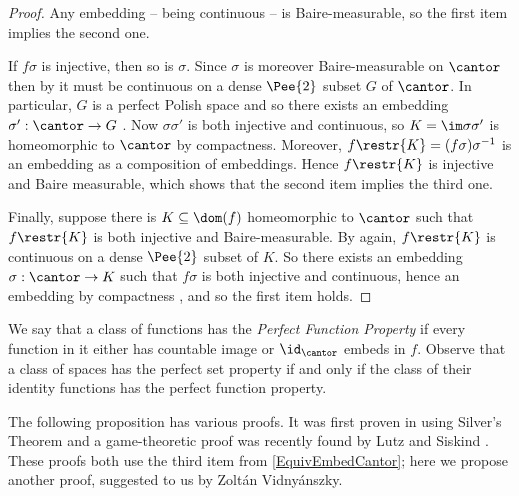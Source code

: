 \begin{proof}
Any embedding -- being continuous -- is Baire-measurable, so the first item implies the second one.

If $f\sigma$ is injective, then so is $\sigma$. Since $\sigma$ is moreover Baire-measurable on $\cantor$ 
then by \cite[(8.38)]{kechris} it must be continuous on a dense $\Pee{2}$ subset $G$ of $\cantor$.
In particular, $G$ is a perfect Polish space and so there exists an embedding $\sigma':\cantor \to G$ \cite[(6.2)]{kechris}.
Now $\sigma\sigma'$ is both injective and continuous, so $K=\im \sigma\sigma'$ is homeomorphic to $\cantor$ by compactness. Moreover, $f\restr{K}=(f\sigma) \sigma^{-1}$ is an embedding as a composition of embeddings. Hence $f\restr{K}$ is injective and Baire measurable, which shows that the second item implies the third one.

Finally, suppose there is $K\subseteq \dom(f)$ homeomorphic to $\cantor$ such that $f\restr{K}$ is both injective and Baire-measurable. By
\cite[(8.38)]{kechris} again, $f\restr{K}$ is continuous on a dense $\Pee{2}$ subset of $K$. So there exists an embedding $\sigma:\cantor\to K$
such that $f\sigma$ is both injective and continuous, hence an embedding by compactness%
, and so the first item holds.
\end{proof}

We say that a class of functions has the \emph{Perfect Function Property} if every function in it either has countable image or $\id_{\cantor}$ embeds in $f$.
Observe that a class of spaces has the perfect set property if and only if the class of their identity functions has the perfect function property.

The following proposition has various proofs. It was first proven in \cite[Proposition 2.1]{carroy2013quasi} using Silver's Theorem and
 a game-theoretic proof was recently found by Lutz and Siskind \cite{lutz20231}.
 These proofs both use the third item from \cref{EquivEmbedCantor}; here we propose another proof, suggested to us by Zolt\'an Vidny\'anszky.

